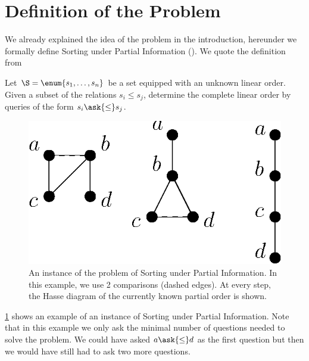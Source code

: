 \section{Definition of the Problem}

We already explained the idea of the problem in the introduction, hereunder we
formally define Sorting under Partial Information (\SUPI).
We quote the definition from \citet*{cardinal:2013}
\begin{problem}
Let $\S = \enum{s_1 , \ldots , s_n}$ be a set
equipped with an unknown linear order. Given a subset of the relations $s_i
\leq s_j$, determine the complete linear order by queries of the form
\(s_i \ask{\leq} s_j\).
\end{problem}

\begin{figure} \centering \includegraphics[height=0.2\textheight]{fig/supi/ex2}
\caption{An instance of the problem of Sorting under Partial Information. In
this example, we use 2 comparisons (dashed edges). At every step, the Hasse
diagram of the currently known partial order is shown.}
\label{fig:supi:def:ex2} \end{figure}

\ref{fig:supi:def:ex2} shows an example of an instance of Sorting under Partial
Information. Note that in this example we only ask the minimal number of
questions needed to solve the problem. We could have asked $a \ask{\le}
d$ as the first question but then we would have still had to ask two more
questions.
